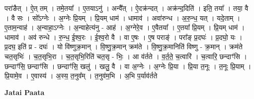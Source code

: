 \documentclass[17pt]{extarticle}
\begin{document}
परा॑ङैत् । ऐ॒त् तम् । तमे॒तया᳚ । ए॒तयाऽनु॑ । अन्वै᳚त् । ऐ॒दक्र॑न्दत् । अक्र॑न्द॒दिति॑ । इति॒ तया᳚ । तया॒ वै । वै सः । 
सो᳚ऽग्नेः । अ॒ग्नेः प्रि॒यम् । प्रि॒यम् धाम॑ । धामाव॑ । अवा॑रुन्ध । अ॒रु॒न्ध॒ यत् । यदे॒ताम् । ए॒ताम॒न्वाह॑ । अ॒न्वाहा॒ऽग्नेः । अ॒न्वाहेत्य॑नु - आह॑ । अ॒ग्नेरे॒व । ए॒वैतया᳚ । ए॒तया᳚ प्रि॒यम् । प्रि॒यम् धाम॑ । धामाव॑ । 
अव॑ रुन्धे । रु॒न्ध॒ ई॒श्व॒रः । ई॒श्व॒रो वै । वा ए॒षः । ए॒ष पराङ्॑ । परा᳚ङ् प्र॒दघः॑ । प्र॒दघो॒ यः । प्र॒दघ॒ इति॑ प्र - दघः॑ । यो वि॑ष्णुक्र॒मान् । वि॒ष्णु॒क्र॒मान् क्रम॑ते । वि॒ष्णु॒क्र॒मानिति॑ विष्णु - क्र॒मान् । क्रम॑ते चत॒सृभिः॑ । च॒त॒सृभि॒रा । च॒त॒सृभि॒रिति॑ चत॒सृ - भिः॒ । आ व॑र्तते । व॒र्त॒ते॒ च॒त्वारि॑ । च॒त्वारि॒ छन्दाꣳ॑सि । छन्दाꣳ॑सि॒ छन्दाꣳ॑सि । छन्दाꣳ॑सि॒ खलु॑ । खलु॒ वै । वा अ॒ग्नेः । अ॒ग्नेः प्रि॒या । प्रि॒या त॒नूः । त॒नूः प्रि॒याम् । प्रि॒यामे॒व । ए॒वास्य॑ । अ॒स्य॒ त॒नुव᳚म् । त॒नुव॑म॒भि । अ॒भि प॒र्याव॑र्तते \newline

\textbf{Jatai Paata} \newline
\end{document}
